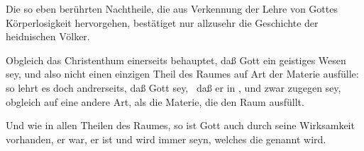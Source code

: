 Die so eben berührten Nachtheile, die aus Verkennung der Lehre von Gottes Körperlosigkeit hervorgehen, bestätiget nur allzusehr die Geschichte der heidnischen Völker.

\begin{aufza}
\item Obgleich das Christenthum einerseits behauptet, daß Gott ein geistiges Wesen sey, und also nicht einen einzigen Theil des Raumes auf Art der Materie ausfülle: so lehrt es doch andrerseits, daß Gott  sey, \dh\ daß er in , und zwar  zugegen sey, obgleich auf eine andere Art, als die Materie, die den Raum ausfüllt.~
\item Und wie in allen Theilen des Raumes, so ist Gott auch  durch seine Wirksamkeit vorhanden, er war, er ist und wird immer seyn, welches die  genannt wird.
\end{aufza}

